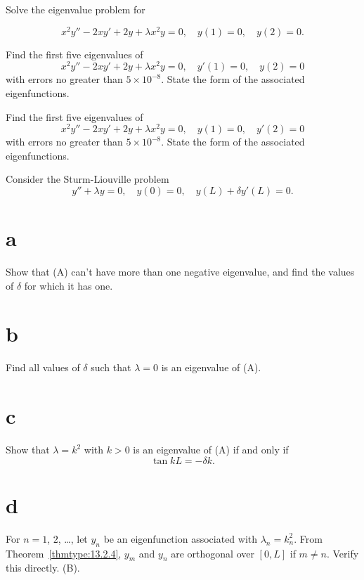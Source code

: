 \begin{exerciselist}

  \item\label{exer:13.2.22} Solve the eigenvalue problem for

  \[
    x^{2}y''-2xy'+2y+\lambda x^{2}y=0,\quad y(1)=0,\quad y(2)=0.
  \]

  \item\label{exer:13.2.23} \Cex Find the first five eigenvalues of
  \[
    x^{2}y''-2xy'+2y+\lambda x^{2}y=0,\quad y'(1)=0,\quad y(2)=0
  \]
  with errors no greater than $5\times10^{-8}$. State the form of the associated eigenfunctions.

  \item\label{exer:13.2.24} \Cex Find the first five eigenvalues of
  \[
    x^{2}y''-2xy'+2y+\lambda x^{2}y=0,\quad y(1)=0,\quad y'(2)=0
  \]
  with errors no greater than $5\times10^{-8}$. State the form of the associated eigenfunctions.

  \item\label{exer:13.2.25} Consider the Sturm-Liouville problem
  \begin{equation}
    \tag{A}y''+\lambda y=0,\quad y(0)=0,\quad y(L)+\delta y'(L)=0.
  \end{equation}

  \part{a} Show that (A) can't have more than one negative eigenvalue, and find the values of
  $\delta$ for which it has one.

  \part{b} Find all values of $\delta$ such that $\lambda=0$ is an eigenvalue of (A).

  \part{c} Show that $\lambda=k^{2}$ with $k>0$ is an eigenvalue of (A) if and only if
  \begin{equation}
    \tag{B}\tan kL=-\delta k.
  \end{equation}

  \part{d} For $n=1$, $2$, \dots, let $y_{n}$ be an eigenfunction associated with
  $\lambda_{n}=k_{n}^{2}$. From Theorem~\ref{thmtype:13.2.4}, $y_{m}$ and $y_{n}$ are orthogonal
  over $[0,L]$ if $m\ne n$. Verify this directly.  (B).


\end{exerciselist}
